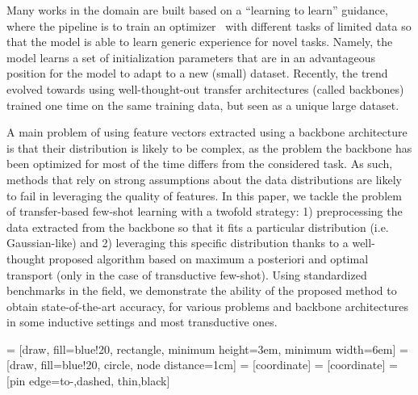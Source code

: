 \documentclass[twoside]{article}
\begin{document}
Many works in the domain are built based on a ``learning to learn'' guidance, where the pipeline is to train an optimizer~\cite{finn2017model, ravi2016optimization,thrun2012learning} with different tasks of limited data so that the model is able to learn generic experience for novel tasks. Namely, the model learns a set of initialization parameters that are in an advantageous position for the model to adapt to a new (small) dataset. Recently, the trend evolved towards using well-thought-out transfer architectures (called backbones)~\cite{torrey2010transfer,das2019two} trained one time on the same training data, but seen as a unique large dataset.

A main problem of using feature vectors extracted using a backbone architecture is that their distribution is likely to be complex, as the problem the backbone has been optimized for most of the time differs from the considered task. As such, methods that rely on strong assumptions about the data distributions are likely to fail in leveraging the quality of features. In this paper, we tackle the problem of transfer-based few-shot learning with a twofold strategy: 1) preprocessing the data extracted from the backbone so that it fits a particular distribution (i.e. Gaussian-like) and 2) leveraging this specific distribution thanks to a well-thought proposed algorithm based on maximum a posteriori and optimal transport (only in the case of transductive few-shot). Using standardized benchmarks in the field, we demonstrate the ability of the proposed method to obtain state-of-the-art accuracy, for various problems and backbone architectures in some inductive settings and most transductive ones.

\usetikzlibrary{shapes,arrows}
 = [draw, fill=blue!20, rectangle, 
    minimum height=3em, minimum width=6em]
 = [draw, fill=blue!20, circle, node distance=1cm]
 = [coordinate]
 = [coordinate]
 = [pin edge={to-,dashed, thin,black}]
\end{document}
